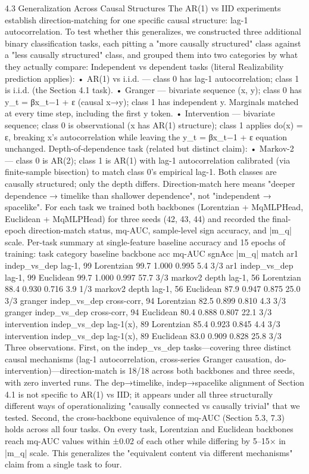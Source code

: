 4.3 Generalization Across Causal Structures
The AR(1) vs IID experiments establish direction-matching for one specific causal structure: lag-1 autocorrelation. To test whether this generalizes, we constructed three additional binary classification tasks, each pitting a "more causally structured" class against a "less causally structured" class, and grouped them into two categories by what they actually compare:
Independent vs dependent tasks (literal Realizability prediction applies):
	•	AR(1) vs i.i.d. — class 0 has lag-1 autocorrelation; class 1 is i.i.d. (the Section 4.1 task).
	•	Granger — bivariate sequence (x, y); class 0 has y_t = βx_{t−1} + ε (causal x→y); class 1 has independent y. Marginals matched at every time step, including the first y token.
	•	Intervention — bivariate sequence; class 0 is observational (x has AR(1) structure); class 1 applies do(x) = ε, breaking x's autocorrelation while leaving the y_t = βx_{t−1} + ε equation unchanged.
Depth-of-dependence task (related but distinct claim):
	•	Markov-2 — class 0 is AR(2); class 1 is AR(1) with lag-1 autocorrelation calibrated (via finite-sample bisection) to match class 0's empirical lag-1. Both classes are causally structured; only the depth differs. Direction-match here means "deeper dependence → timelike than shallower dependence", not "independent → spacelike".
For each task we trained both backbones (Lorentzian + MqMLPHead, Euclidean + MqMLPHead) for three seeds (42, 43, 44) and recorded the final-epoch direction-match status, mq-AUC, sample-level sign accuracy, and |m_q| scale. Per-task summary at single-feature baseline accuracy and 15 epochs of training:
task
category
baseline
backbone
acc
mq-AUC
sgnAcc
|m_q|
match
ar1
indep_vs_dep
lag-1, 99%
Lorentzian
99.7%
1.000
0.995
5.4
3/3
ar1
indep_vs_dep
lag-1, 99%
Euclidean
99.7%
1.000
0.997
57.7
3/3
markov2
depth
lag-1, 56%
Lorentzian
88.4%
0.930
0.716
3.9
1/3
markov2
depth
lag-1, 56%
Euclidean
87.9%
0.947
0.875
25.0
3/3
granger
indep_vs_dep
cross-corr, 94%
Lorentzian
82.5%
0.899
0.810
4.3
3/3
granger
indep_vs_dep
cross-corr, 94%
Euclidean
80.4%
0.888
0.807
22.1
3/3
intervention
indep_vs_dep
lag-1(x), 89%
Lorentzian
85.4%
0.923
0.845
4.4
3/3
intervention
indep_vs_dep
lag-1(x), 89%
Euclidean
83.0%
0.909
0.828
25.8
3/3
Three observations. First, on the indep_vs_dep tasks—covering three distinct causal mechanisms (lag-1 autocorrelation, cross-series Granger causation, do-intervention)—direction-match is 18/18 across both backbones and three seeds, with zero inverted runs. The dep→timelike, indep→spacelike alignment of Section 4.1 is not specific to AR(1) vs IID; it appears under all three structurally different ways of operationalizing "causally connected vs causally trivial" that we tested.
Second, the cross-backbone equivalence of mq-AUC (Section 5.3, 7.3) holds across all four tasks. On every task, Lorentzian and Euclidean backbones reach mq-AUC values within ±0.02 of each other while differing by 5–15× in |m_q| scale. This generalizes the "equivalent content via different mechanisms" claim from a single task to four.

